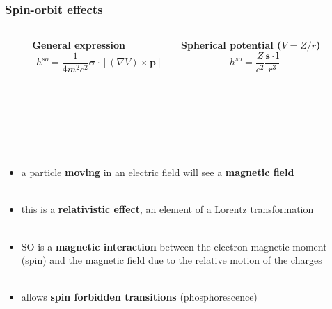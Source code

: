 \documentclass[mathserif,8pt]{beamer}
\begin{document}
\begin{frame}
    \frametitle{Spin-orbit effects}
    \begin{columns}
    \begin{column}{.10\textwidth}
	\ \\
    \end{column}
    \begin{column}{.40\textwidth}
	\centering
    \textbf{General expression}
    \begin{equation}
	\nonumber
	h^{so} = \frac{1}{4m^2c^2}\boldsymbol{\sigma}\cdot
	    \left[\left(\nabla V\right)\times\boldsymbol{p}\right]
    \end{equation}
    \end{column}
    \begin{column}{.40\textwidth}
	\centering
	\textbf{Spherical potential ($V=Z/r$)}
	\begin{equation}
	    \nonumber
	    h^{so} = \frac{Z}{c^2}\frac{\boldsymbol{s}\cdot\boldsymbol{l}}{r^3}
	\end{equation}
    \end{column}
    \begin{column}{.10\textwidth}
	\ \\
    \end{column}
    \end{columns}
    \ \\
    \ \\
    \ \\
    \ \\
    \begin{columns}
    \begin{column}{.40\textwidth}
    \begin{itemize}
	\item	a particle \textbf{moving} in an electric field will see a \textbf{magnetic field}\\
		\ \\
	\item	this is a \textbf{relativistic effect}, an element of a Lorentz transformation\\
		\ \\
	\item	SO is a \textbf{magnetic interaction} between the electron magnetic moment\\ 
		(spin) and the magnetic field due to the relative motion of the charges\\
		\ \\
	\item	allows \textbf{spin forbidden transitions} (phosphorescence)\\

\end{itemize}
\end{column}
\end{columns}
\end{frame}
\end{document}
